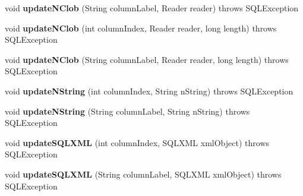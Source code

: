\begin{DoxyCompactItemize}
void {\bfseries update\+N\+Clob} (String column\+Label, Reader reader)  throws S\+Q\+L\+Exception 
\item 
\mbox{\label{classcom_1_1mysql_1_1cj_1_1jdbc_1_1result_1_1_result_set_impl_a1538ff529eb81f6cd5ae24a636bf2627}} 
void {\bfseries update\+N\+Clob} (int column\+Index, Reader reader, long length)  throws S\+Q\+L\+Exception 
\item 
\mbox{\label{classcom_1_1mysql_1_1cj_1_1jdbc_1_1result_1_1_result_set_impl_ad2117ac48a372c4bb4723c63e42c8456}} 
void {\bfseries update\+N\+Clob} (String column\+Label, Reader reader, long length)  throws S\+Q\+L\+Exception 
\item 
\mbox{\label{classcom_1_1mysql_1_1cj_1_1jdbc_1_1result_1_1_result_set_impl_aed47f8dccee46062705ae0ecb1524d2e}} 
void {\bfseries update\+N\+String} (int column\+Index, String n\+String)  throws S\+Q\+L\+Exception 
\item 
\mbox{\label{classcom_1_1mysql_1_1cj_1_1jdbc_1_1result_1_1_result_set_impl_a74d169393f58a0e173558e19f3a89f30}} 
void {\bfseries update\+N\+String} (String column\+Label, String n\+String)  throws S\+Q\+L\+Exception 
\item 
\mbox{\label{classcom_1_1mysql_1_1cj_1_1jdbc_1_1result_1_1_result_set_impl_a6ad86a9cba6c0bb5a8324945efb6461d}} 
void {\bfseries update\+S\+Q\+L\+X\+ML} (int column\+Index, S\+Q\+L\+X\+ML xml\+Object)  throws S\+Q\+L\+Exception 
\item 
\mbox{\label{classcom_1_1mysql_1_1cj_1_1jdbc_1_1result_1_1_result_set_impl_a97b4b9e3ba5c55b9c577489289d6f743}} 
void {\bfseries update\+S\+Q\+L\+X\+ML} (String column\+Label, S\+Q\+L\+X\+ML xml\+Object)  throws S\+Q\+L\+Exception 
\item 
\mbox{\label{classcom_1_1mysql_1_1cj_1_1jdbc_1_1result_1_1_result_set_impl_ade0a8182b48fb34ab1837d0c237bc79b}} 

\end{DoxyCompactItemize}
